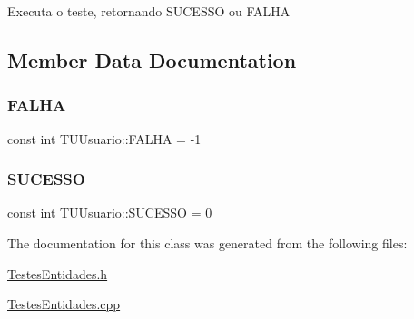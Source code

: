 Executa o teste, retornando S\+U\+C\+E\+S\+SO ou F\+A\+L\+HA 

\subsection{Member Data Documentation}
\mbox{\label{class_t_u_usuario_af1a7217e0d002f0d0b524c901bb75c98}} 
\subsubsection{\texorpdfstring{F\+A\+L\+HA}{FALHA}}
{\footnotesize\ttfamily const int T\+U\+Usuario\+::\+F\+A\+L\+HA = -\/1\hspace{0.3cm}{\ttfamily [static]}}

\mbox{\label{class_t_u_usuario_aa9302e7d6f13452c83f21224fd335e54}} 
\subsubsection{\texorpdfstring{S\+U\+C\+E\+S\+SO}{SUCESSO}}
{\footnotesize\ttfamily const int T\+U\+Usuario\+::\+S\+U\+C\+E\+S\+SO = 0\hspace{0.3cm}{\ttfamily [static]}}



The documentation for this class was generated from the following files\+:\begin{DoxyCompactItemize}
\item 
\hyperlink{_testes_entidades_8h}{Testes\+Entidades.\+h}\item 
\hyperlink{_testes_entidades_8cpp}{Testes\+Entidades.\+cpp}\end{DoxyCompactItemize}
